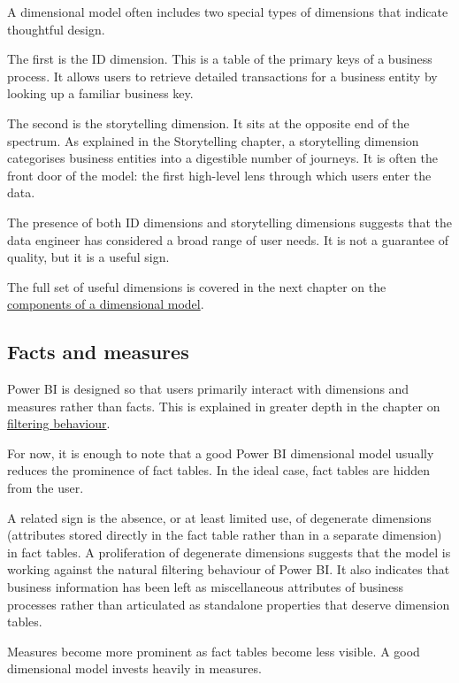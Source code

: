 \documentclass[10pt,openany,10pt]{book}
\begin{document}
A dimensional model often includes two special types of dimensions that
indicate thoughtful design.

The first is the ID dimension. This is a table of the primary keys of a
business process. It allows users to retrieve detailed transactions for
a business entity by looking up a familiar business key.

The second is the storytelling dimension. It sits at the opposite end of
the spectrum. As explained in the Storytelling chapter, a storytelling
dimension categorises business entities into a digestible number of
journeys. It is often the front door of the model: the first high-level
lens through which users enter the data.

The presence of both ID dimensions and storytelling dimensions suggests
that the data engineer has considered a broad range of user needs. It is
not a guarantee of quality, but it is a useful sign.

The full set of useful dimensions is covered in the next chapter on the
\hyperref[docs-presenting-insights-dimensional-modelling-for-ux]{components
of a dimensional model}.

\subsection{Facts and measures}\label{facts-and-measures}

Power BI is designed so that users primarily interact with dimensions
and measures rather than facts. This is explained in greater depth in
the chapter on
\hyperref[docs-presenting-insights-filtering-behaviour]{filtering
behaviour}.

For now, it is enough to note that a good Power BI dimensional model
usually reduces the prominence of fact tables. In the ideal case, fact
tables are hidden from the user.

A related sign is the absence, or at least limited use, of degenerate
dimensions (attributes stored directly in the fact table rather than in
a separate dimension) in fact tables. A proliferation of degenerate
dimensions suggests that the model is working against the natural
filtering behaviour of Power BI. It also indicates that business
information has been left as miscellaneous attributes of business
processes rather than articulated as standalone properties that deserve
dimension tables.

Measures become more prominent as fact tables become less visible. A
good dimensional model invests heavily in measures.
\end{document}
